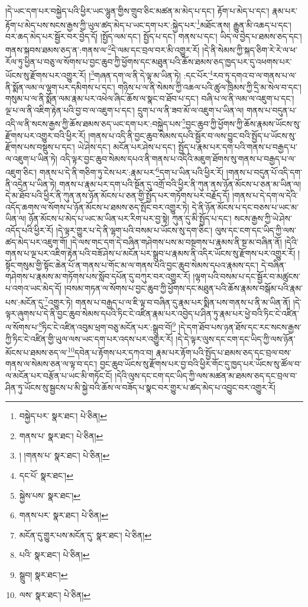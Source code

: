 །དེ་ཡང་དག་པར་བསྐྱེད་པའི་ཕྱིར་ཡང་ལྷུན་གྱིས་གྲུབ་ཅིང་མཚན་མ་མེད་པ་དང་། རྟོག་པ་མེད་པ་དང་། རྣམ་པར་རྟོག་པ་མེད་པས་སངས་རྒྱས་ཀྱི་ཡུལ་ཚད་མེད་པ་ཡང་དག་པར་:སྐྱེད་པར་\footnote{བསྐྱེད་པར་  སྣར་ཐང་།  པེ་ཅིན། }མཐོང་ནས། རྒྱུན་མི་འཆད་པ་དང་། བར་ཆད་མེད་པར་སྦྱོར་བར་བྱེད་དོ། །སྤྱོད་ལམ་དང་། སྤྱོད་པ་དང་། གནས་པ་དང་། ཡིད་ལ་བྱེད་པ་ཐམས་ཅད་དང་། གནས་སྐབས་ཐམས་ཅད་ན་:གནས་ལ་\footnote{གནས་པ་  སྣར་ཐང་།  པེ་ཅིན། }དེ་ལམ་དང་བྲལ་བར་མི་འགྱུར་རོ། །དེ་ནི་སེམས་ཀྱི་སྐད་ཅིག་རེ་རེ་ལ་ཕ་རོལ་ཏུ་ཕྱིན་པ་བཅུ་ལ་སོགས་པ་བྱང་ཆུབ་ཀྱི་ཕྱོགས་དང་མཐུན་པའི་ཆོས་ཐམས་ཅད་ཁྱད་པར་དུ་འཕགས་པར་ཡོངས་སུ་རྫོགས་པར་འགྱུར་རོ། །\footnote{། །གནས་པ་  སྣར་ཐང་།  པེ་ཅིན། }གཞན་དག་ལ་ནི་དེ་ལྟ་མ་ཡིན་ཏེ། :དང་པོར་\footnote{དང་པོ་  སྣར་ཐང་། }རབ་ཏུ་དགའ་བ་ལ་གནས་པ་ལ་ནི་སྨོན་ལམ་ལ་ལྷག་པར་དམིགས་པ་དང་། གཉིས་པ་ལ་ནི་སེམས་ཀྱི་འཆལ་པའི་ཚུལ་ཁྲིམས་ཀྱི་དྲི་མ་སེལ་བ་དང་། གསུམ་པ་ལ་ནི་སྨོན་ལམ་རྣམ་པར་འཕེལ་ཞིང་ཆོས་ལ་སྣང་བ་ཐོབ་པ་དང་། བཞི་པ་ལ་ནི་ལམ་ལ་འཇུག་པ་དང་། ལྔ་པ་ལ་ནི་འཇིག་རྟེན་པའི་བྱ་བ་ལ་འཇུག་པ་དང་། དྲུག་པ་ལ་ནི་ཟབ་མོ་ལ་འཇུག་པ་ཡིན་ལ། གནས་པ་བདུན་པ་འདི་ལ་ནི་སངས་རྒྱས་ཀྱི་ཆོས་ཐམས་ཅད་ཡང་དག་པར་:བསྐྱེད་པས་\footnote{སྐྱེས་པས་  སྣར་ཐང་། }བྱང་ཆུབ་ཀྱི་ཕྱོགས་ཀྱི་ཆོས་རྣམས་ཡོངས་སུ་རྫོགས་པར་འགྱུར་བའི་ཕྱིར་རོ། །གནས་པ་འདི་ནི་བྱང་ཆུབ་སེམས་དཔའི་སྦྱོར་བ་ལས་བྱུང་བའི་སྤྱོད་པ་ཡོངས་སུ་རྫོགས་པས་བསྡུས་པ་དང་། ཡེ་ཤེས་དང་། མངོན་པར་ཤེས་པ་དང་། སྤྱོད་པ་རྣམ་པར་དག་པའི་གནས་པ་བརྒྱད་པ་ལ་འཇུག་པ་ཡིན་ཏེ། འདི་ལྟར་བྱང་ཆུབ་སེམས་དཔའ་ནི་གནས་པ་འདིའི་མཇུག་ཐོགས་སུ་གནས་པ་བརྒྱད་པ་ལ་འཇུག་ཅིང་། གནས་པ་དེ་ནི་གཅིག་ཏུ་ངེས་པར་:རྣམ་པར་\footnote{གནས་པར་  སྣར་ཐང་།  པེ་ཅིན། }དག་པ་ཡིན་པའི་ཕྱིར་རོ། །གནས་པ་བདུན་པོ་འདི་དག་ནི་འདྲེན་པ་ཡིན་ཏེ། གནས་པ་རྣམ་པར་དག་པའི་སྔོན་དུ་འགྲོ་བའི་ཕྱིར་ནི་ཀུན་ནས་ཉོན་མོངས་པ་ཅན་མ་ཡིན་ལ། དེ་མ་ཐོབ་པའི་ཕྱིར་ནི་ཀུན་ནས་ཉོན་མོངས་པ་ཅན་གྱི་སྤྱོད་པར་གཏོགས་པར་བརྗོད་དོ། །གནས་པ་དེ་དག་ལ་དེའི་འདོད་ཆགས་ལ་སོགས་པ་ཉོན་མོངས་པ་ཐམས་ཅད་སྤོང་བར་འགྱུར་ཏེ། དེ་ནི་ཉོན་མོངས་པ་དང་བཅས་པ་ཡང་མ་ཡིན་ལ། ཉོན་མོངས་པ་མེད་པ་ཡང་མ་ཡིན་པར་རིག་པར་བྱ་སྟེ། ཀུན་དུ་མི་སྤྱོད་པ་དང་། སངས་རྒྱས་ཀྱི་ཡེ་ཤེས་འདོད་པའི་ཕྱིར་རོ། །དེ་ལྟར་གྱུར་པ་དེ་ནི་ལྷག་པའི་བསམ་པ་ཡོངས་སུ་དག་ཅིང་། ལུས་དང་ངག་དང་ཡིད་ཀྱི་ལས་ཚད་མེད་པར་འཇུག་གོ། །དེ་ལས་གང་དག་དེ་བཞིན་གཤེགས་པས་མ་བསྔགས་པ་རྣམས་ནི་སྔ་མ་བཞིན་ནོ། །དེའི་གནས་པ་ལྔ་པར་འཇིག་རྟེན་པའི་བཟོ་ཤེས་པ་མངོན་པར་སྒྲུབ་པ་རྣམས་ནི་འདིར་ཡོངས་སུ་རྫོགས་པར་འགྱུར་རོ། །སྟོང་གསུམ་གྱི་སྟོང་ཆེན་པོ་ན་གནས་པ་གོང་མ་ལ་གནས་པའི་བྱང་ཆུབ་སེམས་དཔའ་རྣམས་དང་། དེ་བཞིན་གཤེགས་པ་རྣམས་མ་གཏོགས་པས་སློབ་དཔོན་དུ་བཀུར་བར་འགྱུར་རོ། །ལྷག་པའི་བསམ་པ་དང་སྦྱོར་བ་མཚུངས་པ་འགའ་ཡང་མེད་དོ། །བསམ་གཏན་ལ་སོགས་པ་བྱང་ཆུབ་ཀྱི་ཕྱོགས་དང་མཐུན་པའི་ཆོས་རྣམས་བསྒོམ་པའི་རྣམ་པས་:མངོན་དུ་\footnote{མངོན་དུ་གྱུར་པས་མངོན་དུ་  སྣར་ཐང་།  པེ་ཅིན། }འགྱུར་ཏེ། གནས་པ་བརྒྱད་པ་ལ་ཇི་ལྟ་བ་བཞིན་དུ་རྣམ་པར་སྨིན་པས་གནས་པ་ནི་མ་ཡིན་ནོ། །དེ་ལྟར་ཞུགས་པ་དེ་ནི་བྱང་ཆུབ་སེམས་དཔའི་ཏིང་ངེ་འཛིན་རྣམ་པར་འབྱེད་པ་ཤིན་ཏུ་རྣམ་པར་ཕྱེ་བའི་ཏིང་ངེ་འཛིན་ལ་སོགས་པ་\footnote{པའི་  སྣར་ཐང་།  པེ་ཅིན། }ཏིང་ངེ་འཛིན་འབུམ་ཕྲག་བཅུ་མངོན་པར་:སྒྲུབ་བོ།\footnote{སྒྲུབ།  སྣར་ཐང་། } །དེ་དག་ཐོབ་པས་ཉན་ཐོས་དང་རང་སངས་རྒྱས་ཀྱི་ཏིང་ངེ་འཛིན་གྱི་ཡུལ་ལས་ཡང་དག་པར་འདས་པར་འགྱུར་རོ། །དེ་དེ་ལྟར་ལུས་དང་ངག་དང་ཡིད་ཀྱི་ལས་ཉོན་མོངས་པ་ཐམས་ཅད་ལ་\footnote{ལས་  སྣར་ཐང་།  པེ་ཅིན། }དབེན་པ་རྟོགས་པར་དཀའ་བ། རྣམ་པར་རྟོག་པའི་སྤྱོད་པ་ཐམས་ཅད་དང་བྲལ་བས་གནས་ལ་སེམས་ཅན་ལ་ལྟ་བ་དང་། བྱང་ཆུབ་ཡོངས་སུ་རྫོགས་པར་བྱ་བའི་ཕྱིར་གོང་དུ་ཁྱད་པར་ཡོངས་སུ་ཚོལ་བ་ལ་མངོན་པར་བརྩོན་པ་ཡང་མི་གཏོང་ངོ། །དེའི་ལུས་དང་ངག་དང་ཡིད་ཀྱི་ལས་མཚན་མ་ཐམས་ཅད་དང་བྲལ་བ་ཤིན་ཏུ་ཡོངས་སུ་སྦྱངས་པ་མི་སྐྱེ་བའི་ཆོས་ལ་བཟོད་པ་སྣང་བར་གྱུར་པ་ཚད་མེད་པ་འབྱུང་བར་འགྱུར་རོ། 